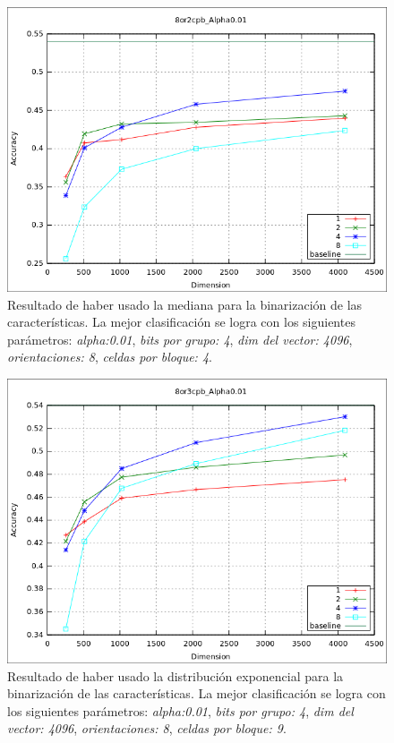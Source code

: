 			\begin{figure}[htbp]
				\centering
				\includegraphics[scale=0.6]{img/resultados/reales/median_8or2cpb_Alpha0,01.png}
				\caption[Reales con umbral mediana]{Resultado de haber usado la mediana para la binarización de las características. La mejor clasificación se logra con los siguientes parámetros: \textit{alpha:0.01}, \textit{bits por grupo: 4}, \textit{dim del vector: 4096}, \textit{orientaciones: 8}, \textit{celdas por bloque: 4}.}
				\label{fig: Reales-mediana-8or4cpbAlph0.01}
			\end{figure}
			
			\begin{figure}[htbp]
				\centering
				\includegraphics[scale=0.6]{img/resultados/reales/expon_8or3cpb_Alpha0,01.png}
				\caption[Reales con umbral exponencial]{Resultado de haber usado la distribución exponencial para la binarización de las características. La mejor clasificación se logra con los siguientes parámetros: \textit{alpha:0.01}, \textit{bits por grupo: 4}, \textit{dim del vector: 4096}, \textit{orientaciones: 8}, \textit{celdas por bloque: 9}.}
				\label{fig: Reales-expon-8or9cpbAlph0.01}
			\end{figure}
			
